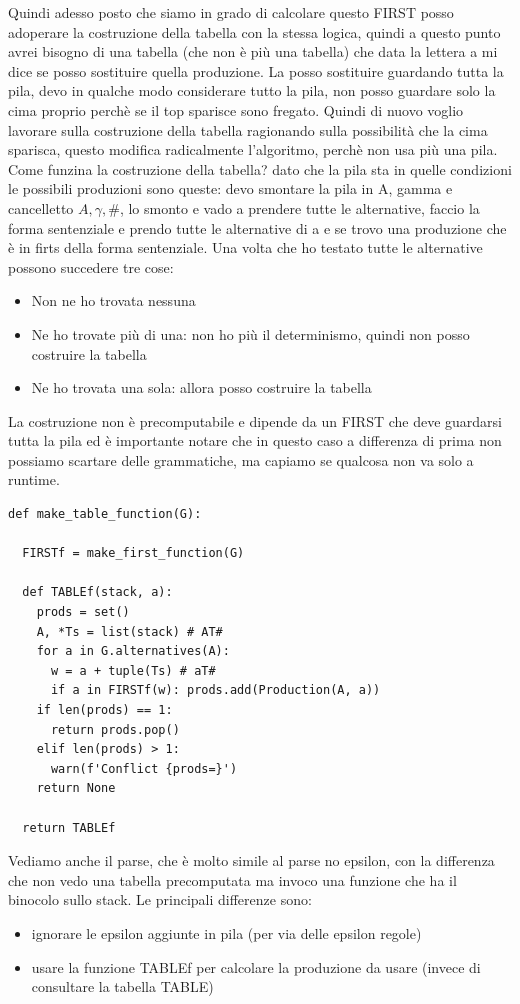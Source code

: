 Quindi adesso posto che siamo in grado di calcolare questo FIRST posso adoperare la costruzione della tabella con la stessa logica, quindi a questo punto avrei bisogno di una tabella (che non è più una tabella) che data la lettera a mi dice se posso sostituire quella produzione. La posso sostituire guardando tutta la pila, devo in qualche modo considerare tutto la pila, non posso guardare solo la cima proprio perchè se il top sparisce sono fregato. Quindi di nuovo voglio lavorare sulla costruzione della tabella ragionando sulla possibilità che la cima sparisca, questo modifica radicalmente l'algoritmo, perchè non usa più una pila.
Come funzina la costruzione della tabella? dato che la pila sta in quelle condizioni le possibili produzioni sono queste:
devo smontare la pila in A, gamma e cancelletto $A, \gamma, \#$, lo smonto e vado a prendere tutte le alternative, faccio la forma sentenziale e prendo tutte le alternative di a e se trovo una produzione che è in firts della forma sentenziale. Una volta che ho testato tutte le alternative possono succedere tre cose:
\begin{itemize}
  \item Non ne ho trovata nessuna
  \item Ne ho trovate più di una: non ho più il determinismo, quindi non posso costruire la tabella
  \item Ne ho trovata una sola: allora posso costruire la tabella
\end{itemize}

La costruzione non è precomputabile e dipende da un FIRST che deve guardarsi tutta la pila ed è importante notare che in questo caso a differenza di prima non possiamo scartare delle grammatiche, ma capiamo se qualcosa non va solo a runtime.

\begin{lstlisting}
def make_table_function(G):

  FIRSTf = make_first_function(G)

  def TABLEf(stack, a):
    prods = set()
    A, *Ts = list(stack) # AT#
    for a in G.alternatives(A):
      w = a + tuple(Ts) # aT#
      if a in FIRSTf(w): prods.add(Production(A, a))
    if len(prods) == 1:
      return prods.pop()
    elif len(prods) > 1:
      warn(f'Conflict {prods=}')
    return None
  
  return TABLEf
\end{lstlisting}

Vediamo anche il parse, che è molto simile al parse no epsilon, con la differenza che non vedo una tabella precomputata ma invoco una funzione che ha il binocolo sullo stack.
Le principali differenze sono:
\begin{itemize}
  \item ignorare le epsilon aggiunte in pila (per via delle epsilon regole)
  \item usare la funzione TABLEf per calcolare la produzione da usare (invece di consultare la tabella TABLE)
\end{itemize}

